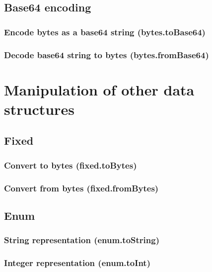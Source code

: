 \documentclass{article}
\theoremstyle{definition}
\begin{document}
\subsection{Base64 encoding}

\subsubsection{Encode bytes as a base64 string (bytes.toBase64)}

\subsubsection{Decode base64 string to bytes (bytes.fromBase64)}

\pagebreak
\section{Manipulation of other data structures}

\subsection{Fixed}

\subsubsection{Convert to bytes (fixed.toBytes)}

\subsubsection{Convert from bytes (fixed.fromBytes)}

\subsection{Enum}

\subsubsection{String representation (enum.toString)}

\subsubsection{Integer representation (enum.toInt)}
\end{document}
